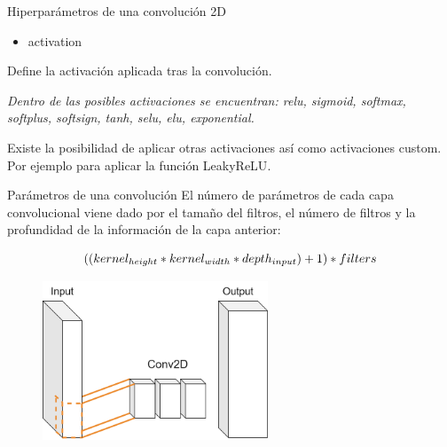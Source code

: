 \begin{frame}{Hiperparámetros de una convolución 2D}
\begin{itemize}
    \item \alert{\Large activation}
\end{itemize}

Define la \alert{activación} aplicada tras la convolución.

\textit{Dentro de las posibles activaciones se encuentran: relu, sigmoid, softmax, softplus, softsign, tanh, selu, elu, exponential.}

Existe la posibilidad de aplicar \alert{otras} activaciones así como activaciones \alert{custom}. Por ejemplo para aplicar la función \alert{LeakyReLU}.

\end{frame}

\begin{frame}{Parámetros de una convolución}
El número de parámetros de cada \alert{capa convolucional} viene dado por el tamaño del \alert{filtros}, el número de \alert{filtros} y la \alert{profundidad} de la información de la capa anterior:

\begin{equation}
    {\large ((kernel_{height} * kernel_{width} * depth_{input}) + 1) * filters}
\end{equation}

\begin{figure}
    \centering
    \includegraphics[width=0.6\textwidth]{Slides/figures/Tema 3/ConvParams.png}
\end{figure}
\end{frame}

